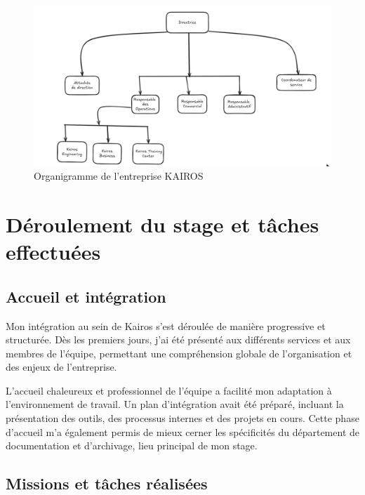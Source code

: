     \vspace{1cm}
    \begin{figure}[H]
        \centering
        \centerline{\includegraphics[width=1\linewidth]{Images/org2.png}}
        \caption{Organigramme de l'entreprise KAIROS}
        \label{fig:organigramme_kairos}
    \end{figure}

\section{Déroulement du stage et tâches effectuées}

    \subsection{Accueil et intégration}
    
    Mon intégration au sein de Kairos s'est déroulée de manière progressive et structurée. Dès les premiers jours, j'ai été présenté aux différents services et aux membres de l'équipe, permettant une compréhension globale de l'organisation et des enjeux de l'entreprise.
    
    L'accueil chaleureux et professionnel de l'équipe a facilité mon adaptation à l'environnement de travail. Un plan d'intégration avait été préparé, incluant la présentation des outils, des processus internes et des projets en cours. Cette phase d'accueil m'a également permis de mieux cerner les spécificités du département de documentation et d'archivage, lieu principal de mon stage.
    
    \subsection{Missions et tâches réalisées}
    
